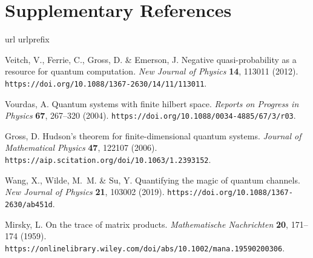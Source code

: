 \documentclass[
twocolumn,
superscriptaddress
]{revtex4-1}
\begin{document}
\onecolumngrid

\section*{Supplementary References}
\vspace{-12pt}

\providecommand{\noopsort}[1]{}\providecommand{\singleletter}[1]{#1}
\begin{thebibliography}{10}
\expandafter\ifx\csname url\endcsname\relax
  \def\url#1{\texttt{#1}}\fi
\expandafter\ifx\csname urlprefix\endcsname\relax\def\urlprefix{}\fi
\providecommand{\bibinfo}[2]{#2}
\providecommand{\eprint}[2][]{\url{#2}}

\bibinfo{author}{Veitch, V.}, \bibinfo{author}{Ferrie, C.},
  \bibinfo{author}{Gross, D.} \& \bibinfo{author}{Emerson, J.}
\newblock \bibinfo{title}{Negative quasi-probability as a resource for quantum
  computation}.
\newblock \emph{\bibinfo{journal}{New Journal of Physics}}
  \textbf{\bibinfo{volume}{14}}, \bibinfo{pages}{113011}
  (\bibinfo{year}{2012}).
\newblock \urlprefix\url{https://doi.org/10.1088/1367-2630/14/11/113011}.

\bibinfo{author}{Vourdas, A.}
\newblock \bibinfo{title}{Quantum systems with finite hilbert space}.
\newblock \emph{\bibinfo{journal}{Reports on Progress in Physics}}
  \textbf{\bibinfo{volume}{67}}, \bibinfo{pages}{267--320}
  (\bibinfo{year}{2004}).
\newblock \urlprefix\url{https://doi.org/10.1088/0034-4885/67/3/r03}.

\bibinfo{author}{Gross, D.}
\newblock \bibinfo{title}{Hudson’s theorem for finite-dimensional quantum
  systems}.
\newblock \emph{\bibinfo{journal}{Journal of Mathematical Physics}}
  \textbf{\bibinfo{volume}{47}}, \bibinfo{pages}{122107}
  (\bibinfo{year}{2006}).
\newblock \urlprefix\url{https://aip.scitation.org/doi/10.1063/1.2393152}.

\bibinfo{author}{Wang, X.}, \bibinfo{author}{Wilde, M.~M.} \&
  \bibinfo{author}{Su, Y.}
\newblock \bibinfo{title}{Quantifying the magic of quantum channels}.
\newblock \emph{\bibinfo{journal}{New Journal of Physics}}
  \textbf{\bibinfo{volume}{21}}, \bibinfo{pages}{103002}
  (\bibinfo{year}{2019}).
\newblock \urlprefix\url{https://doi.org/10.1088/1367-2630/ab451d}.

\bibinfo{author}{Mirsky, L.}
\newblock \bibinfo{title}{On the trace of matrix products}.
\newblock \emph{\bibinfo{journal}{Mathematische Nachrichten}}
  \textbf{\bibinfo{volume}{20}}, \bibinfo{pages}{171--174}
  (\bibinfo{year}{1959}).
\newblock
  \urlprefix\url{https://onlinelibrary.wiley.com/doi/abs/10.1002/mana.19590200306}.


\end{thebibliography}
\end{document}
